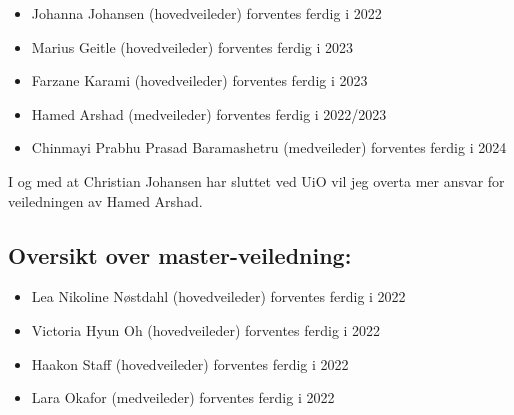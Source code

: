 \documentclass[11pt]{article}
\begin{document}
\begin{itemize}
\item Johanna Johansen (hovedveileder) forventes ferdig i 2022
\item Marius Geitle  (hovedveileder) forventes ferdig i 2023
\item Farzane Karami  (hovedveileder) forventes ferdig i 2023
\item Hamed Arshad  (medveileder) forventes ferdig i 2022/2023
\item Chinmayi Prabhu Prasad Baramashetru  (medveileder) forventes ferdig
i 2024
\end{itemize}
I og med at Christian Johansen har sluttet ved UiO
vil jeg overta mer ansvar for veiledningen av Hamed Arshad.
\subsection*{Oversikt over master-veiledning:}
\label{sec-4-2}
\begin{itemize}
\item Lea Nikoline Nøstdahl (hovedveileder) forventes ferdig i 2022
\item Victoria Hyun Oh (hovedveileder) forventes ferdig i 2022
\item Haakon Staff (hovedveileder) forventes ferdig i 2022
\item Lara Okafor (medveileder) forventes ferdig i 2022
\end{itemize}
\end{document}
